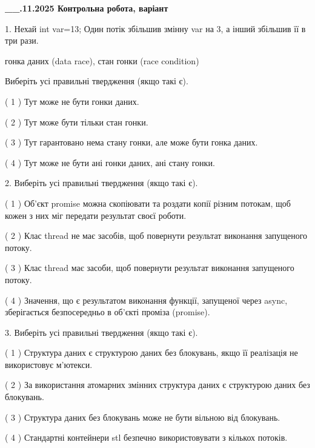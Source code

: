 \documentclass[12pt, ukrainian]{article}
\begin{document}
\newpage
\begin {large}

\textbf{\_\_.11.2025 Контрольна робота, варіант  }\par


{
1. Нехай int var=13; Один потік збільшив змінну var на 3, а інший збільшив її в три рази.

гонка даних (data race), стан гонки (race condition)

Виберіть усі правильні твердження (якщо такі є).\par
\vspace{2mm}
( 1 ) Тут може не бути гонки даних.%

( 2 ) Тут може бути тільки стан гонки.%

( 3 ) Тут гарантовано нема стану гонки, але може бути гонка даних.%

( 4 ) Тут може не бути ані гонки даних, ані стану гонки.%


2. Виберіть усі правильні твердження (якщо такі є).\par
\vspace{2mm}

( 1 ) Об’єкт promise можна скопіювати та роздати копії різним потокам, щоб кожен з них міг передати результат своєї роботи.%

( 2 ) Клас thread не має засобів, щоб повернути результат виконання запущеного потоку.%

( 3 ) Клас thread має засоби, щоб повернути результат виконання запущеного потоку.%

( 4 ) Значення, що є результатом виконання функції, запущеної через async, зберігається безпосередньо в об’єкті проміза (promise).%


3. Виберіть усі правильні твердження (якщо такі є).\par
\vspace{2mm}

( 1 ) Структура даних є структурою даних без блокувань, якщо її реалізація не використовує м’ютекси.%

( 2 ) За використання атомарних змінних структура даних є структурою даних без блокувань.%

( 3 ) Структура даних без блокувань може не бути вільною від блокувань.%

( 4 ) Стандартні контейнери stl безпечно використовувати з кількох потоків.%


}
\end{large}
\end{document}

